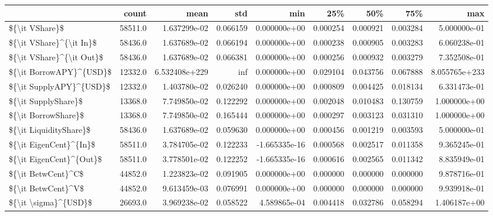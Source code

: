 \begin{tabular}{lrrrrrrrr}
\toprule
{} &    count &           mean &       std &           min &       25\% &       50\% &       75\% &            max \\
\midrule
\$\{\textbackslash it VShare\}\$           &  58511.0 &   1.637299e-02 &  0.066159 &  0.000000e+00 &  0.000254 &  0.000921 &  0.003284 &   5.000000e-01 \\
\$\{\textbackslash it VShare\}\textasciicircum \{\textbackslash it In\}\$  &  58436.0 &   1.637689e-02 &  0.066194 &  0.000000e+00 &  0.000238 &  0.000905 &  0.003283 &   6.060238e-01 \\
\$\{\textbackslash it VShare\}\textasciicircum \{\textbackslash it Out\}\$ &  58436.0 &   1.637689e-02 &  0.066381 &  0.000000e+00 &  0.000256 &  0.000932 &  0.003279 &   7.352508e-01 \\
\$\{\textbackslash it BorrowAPY\}\textasciicircum \{USD\}\$  &  12332.0 &  6.532408e+229 &       inf &  0.000000e+00 &  0.029104 &  0.043756 &  0.067888 &  8.055765e+233 \\
\$\{\textbackslash it SupplyAPY\}\textasciicircum \{USD\}\$  &  12332.0 &   1.403780e-02 &  0.026240 &  0.000000e+00 &  0.000809 &  0.004425 &  0.018134 &   6.331473e-01 \\
\$\{\textbackslash it SupplyShare\}\$      &  13368.0 &   7.749850e-02 &  0.122292 &  0.000000e+00 &  0.002048 &  0.010483 &  0.130759 &   1.000000e+00 \\
\$\{\textbackslash it BorrowShare\}\$      &  13368.0 &   7.749850e-02 &  0.165444 &  0.000000e+00 &  0.000297 &  0.003123 &  0.031310 &   1.000000e+00 \\
\$\{\textbackslash it LiquidityShare\}\$   &  58436.0 &   1.637689e-02 &  0.059630 &  0.000000e+00 &  0.000456 &  0.001219 &  0.003593 &   5.000000e-01 \\
\$\{\textbackslash it EigenCent\}\textasciicircum \{In\}\$   &  58511.0 &   3.784705e-02 &  0.122233 & -1.665335e-16 &  0.000568 &  0.002517 &  0.011358 &   9.365245e-01 \\
\$\{\textbackslash it EigenCent\}\textasciicircum \{Out\}\$  &  58511.0 &   3.778501e-02 &  0.122252 & -1.665335e-16 &  0.000616 &  0.002565 &  0.011342 &   8.835949e-01 \\
\$\{\textbackslash it BetwCent\}\textasciicircum C\$       &  44852.0 &   1.223823e-02 &  0.091905 &  0.000000e+00 &  0.000000 &  0.000000 &  0.000000 &   9.878716e-01 \\
\$\{\textbackslash it BetwCent\}\textasciicircum V\$       &  44852.0 &   9.613459e-03 &  0.076991 &  0.000000e+00 &  0.000000 &  0.000000 &  0.000000 &   9.939918e-01 \\
\$\{\textbackslash it \textbackslash sigma\}\textasciicircum \{USD\}\$     &  26693.0 &   3.969238e-02 &  0.058522 &  4.589865e-04 &  0.004418 &  0.032786 &  0.058294 &   1.406187e+00 \\
\bottomrule
\end{tabular}
